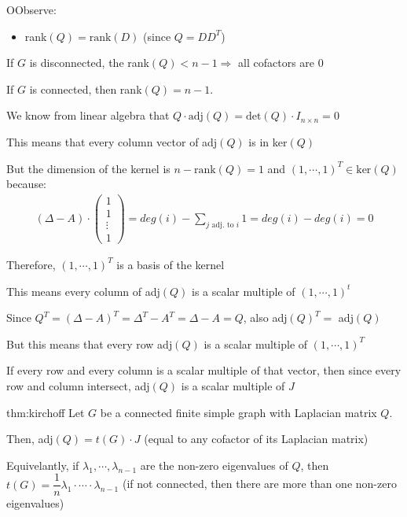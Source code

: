 \par\bigskip
\begin{prf}
  OObserve:\par
  \begin{itemize}
    \item rank$(Q) = \text{rank}(D)$ (since $Q = DD^T$)
  \end{itemize}
  \par\bigskip
  \noindent If $G$ is disconnected, the rank$(Q)<n-1\Rightarrow$ all cofactors are 0
  \par\bigskip
  \noindent If $G$ is connected, then rank$(Q) = n-1$.
  \par\bigskip
  \noindent We know from linear algebra that $Q\cdot\text{adj}(Q) = \text{det}(Q)\cdot I_{n\times n} = 0$
  \par\bigskip
  \noindent This means that every column vector of adj$(Q)$ is in ker$(Q)$
  \par\bigskip
  \noindent But the dimension of the kernel is $n-\text{rank}(Q) = 1$ and $(1,\cdots,1)^T\in\text{ker}(Q)$ because:
  \begin{equation*}
    \begin{gathered}
      (\Delta-A)\cdot\begin{pmatrix}1\\1\\\vdots\\1\end{pmatrix} = deg(i)-\sum_{j\text{ adj. to } i}1 = deg(i)-deg(i) = 0
    \end{gathered}
  \end{equation*}
  \par\bigskip
  \noindent Therefore, $(1,\cdots,1)^T$ is a basis of the kernel
  \par\bigskip
  \noindent This means every column of adj$(Q)$ is a scalar multiple of $(1,\cdots,1)^t$
  \par\bigskip
  \noindent Since $Q^T = (\Delta-A)^T = \Delta^T-A^T = \Delta -A = Q$, also adj$(Q)^T = $ adj$(Q)$
  \par\bigskip
  \noindent But this means that every row adj$(Q)$ is a scalar multiple of $(1,\cdots,1)^T$
  \par\bigskip
  \noindent If every row and every column is a scalar multiple of that vector, then since every row and column intersect, adj$(Q)$ is a scalar multiple of $J$ 
\end{prf}
\par\bigskip
\begin{theo}[Kirchoff]{thm:kirchoff}
  Let $G$ be a connected finite simple graph with Laplacian matrix $Q$.
  \par\bigskip
  \noindent Then, adj$(Q) = t(G)\cdot J$ (equal to any cofactor of its Laplacian matrix)
  \par\bigskip
  \noindent Equivelantly, if $\lambda_1,\cdots,\lambda_{n-1}$ are the non-zero eigenvalues of $Q$, then $t(G) = \dfrac{1}{n}\lambda_1\cdot\cdots\cdot\lambda_{n-1}$ (if not connected, then there are more than one non-zero eigenvalues)
\end{theo}
